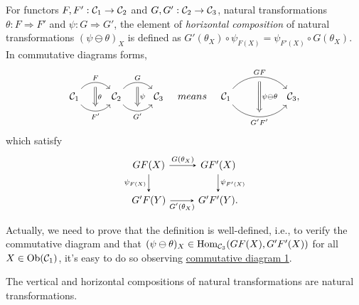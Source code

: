 \documentclass{article}
\begin{document}
\begin{defi}\label{horizontal composition}
	For functors $F,F':\mathcal{C}_1\to\mathcal{C}_2$ and $G,G':\mathcal{C}_2\to\mathcal{C}_3$, natural transformations $\theta:F\Rightarrow F'$ and $\psi:G\Rightarrow G'$, the element of \emph{horizontal composition} of natural transformations $(\psi\ominus\theta)_X$ is defined as $G'(\theta_X)\circ\psi_{F(X)}=\psi_{F'(X)}\circ G(\theta_X)$. In commutative diagrams forms,
	\[\begin{tikzcd}
			\C_1 \arrow[bend left=50, r, "F", ""' name=F] \arrow[bend right=50, r, "F'"', "" name=F'] &
			\C_2 \arrow[bend left=50, r, "G", ""' name=G] \arrow[bend right=50, r, "G'"', "" name=G'] &
			\arrow[Rightarrow, from=F, to=F', "\theta"] \arrow[Rightarrow, from=G, to=G', "\psi"]\C_3
		\end{tikzcd}\quad{means}\quad\begin{tikzcd}
			\C_1
			\arrow[bend left=50, rr, "GF", ""' name=A]
			\arrow[bend right=50, rr, "G'F'"', "" name=B] & & 
			\arrow[Rightarrow, from=A, to=B, "\psi\ominus\theta"]\C_3,
	\end{tikzcd}\]
	which satisfy
	\begin{equation}\begin{tikzcd}\label{hor}
		GF(X) \arrow[->,>=stealth,r,"G(\theta_X)"] \arrow[->,>=stealth,d,"\psi_{F(X)}"'] & GF'(X) \arrow[->,>=stealth,d,"\psi_{F'(X)}"]\\
		G'F(Y) \arrow[->,>=stealth,r,"G'(\theta_X)"'] & G'F'(Y).
	\end{tikzcd}\end{equation}
	
	Actually, we need to prove that the definition is well-defined, i.e., to verify the commutative diagram and that $(\psi\ominus\theta)_X\in\mathrm{Hom}_{\mathcal{C}_3}(GF(X),G'F'(X))$ for all $X\in\mathrm{Ob}(\mathcal{C}_1)$, it's easy to do so observing \hyperref[ntr]{commutative diagram 1}.
\end{defi}


\begin{thm}
	The vertical and horizontal compositions of natural transformations are natural transformations.	
\end{thm}
\end{document}
